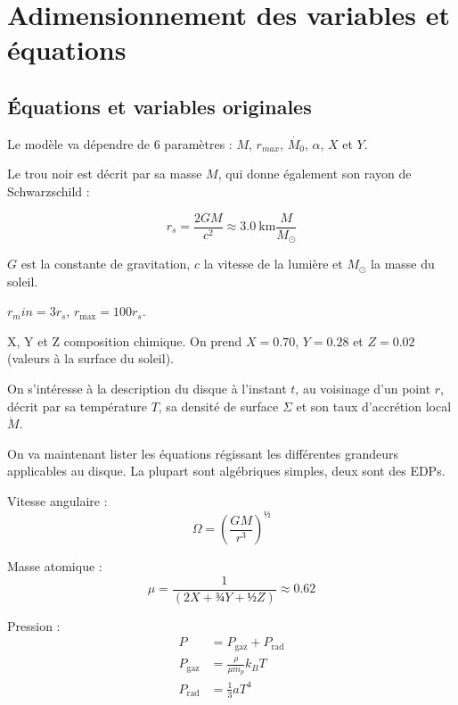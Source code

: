 \section{Adimensionnement des variables et équations}

\subsection{Équations et variables originales}

Le modèle va dépendre de 6 paramètres : $M$, $r_{max}$, $\dot{M_0}$, $\alpha$,
$X$ et $Y$.

Le trou noir est décrit par sa masse $M$, qui donne également son rayon de Schwarzschild :

\begin{equation}
    r_s = \frac{2 G M}{c^2} \approx \SI{3.0}{\kilo\meter} \frac{M}{M_{\odot}}
\end{equation}

$G$ est la constante de gravitation, $c$ la vitesse de la lumière et $M_{\odot}$ la masse du soleil.

$r_min = 3 r_s$, $r_\mathrm{max} = 100 r_s$.

X, Y et Z composition chimique. On prend $X = \num{0.70}$, $Y = \num{0.28}$ et $Z = \num{0.02}$ (valeurs à la surface du soleil).

On s’intéresse à la description du disque à l’instant $t$, au voisinage d’un point $r$, décrit par sa température $T$, sa densité de surface $\Sigma$ et son taux d’accrétion local $\dot{M}$.

On va maintenant lister les équations régissant les différentes grandeurs applicables au disque. La plupart sont algébriques simples, deux sont des EDPs.

Vitesse angulaire : 
\begin{equation}
    \Omega = \left( \frac{G M}{r^3} \right)^½
\end{equation}

Masse atomique :
\begin{equation}
    \mu = \frac{1}{\left(2X + ¾Y + ½Z\right)} \approx 0.62
\end{equation}

Pression :
\begin{align}
    P &= P_{\mathrm{gaz}} + P_{\mathrm{rad}} \\
    P_{\mathrm{gaz}} &= \frac{\rho}{\mu m_p} k_B T \\
    P_{\mathrm{rad}} &= \frac{1}{3} a T^4
\end{align}

